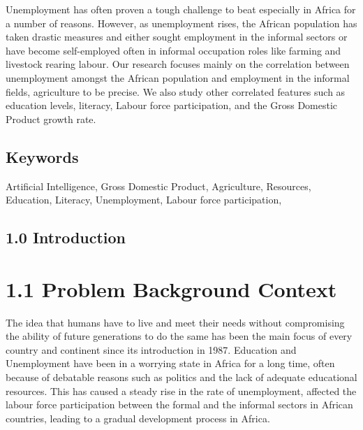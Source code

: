 \documentclass[12pt]{article}
\renewcommand{\_}{\kern-1.5pt\textunderscore\kern-1.5pt}
\begin{document}
\begin{justify}
{\fontsize{9pt}{10.8pt}\selectfont Unemployment has often proven a tough challenge to beat especially in Africa for a number of reasons. However, as unemployment rises, the African population has taken drastic measures and either sought employment in the informal sectors or have become self-employed often in informal occupation roles like farming and livestock rearing labour. Our research focuses mainly on the correlation between unemployment amongst the African population and employment in the informal fields, agriculture to be precise. We also study other correlated features such as education levels, literacy, Labour force participation, and the Gross Domestic Product growth rate. \par}
\end{justify}
\section*{Keywords}
{\fontsize{9pt}{10.8pt}\selectfont Artificial Intelligence, Gross Domestic Product, Agriculture, Resources, Education, Literacy, Unemployment, Labour force participation,\par}
\section*{1.0 Introduction}
\chapter{1.1 Problem Background Context }
\begin{justify}
{\fontsize{9pt}{10.8pt}\selectfont The idea that humans have to live and meet their needs without compromising the ability of future generations to do the same has been the main focus of every country and continent since its introduction in 1987. Education and Unemployment have been in a worrying state in Africa for a long time, often because of debatable reasons such as politics and the lack of adequate educational resources. This has caused a steady rise in the rate of unemployment, affected the labour force participation between the formal and the informal sectors in African countries, leading to a gradual development process in Africa.\par}
\end{justify}

\vspace{\baselineskip}
\end{document}
